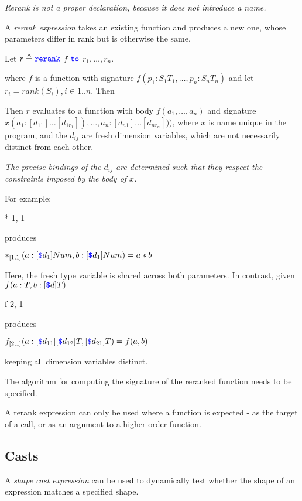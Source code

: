 \documentclass{article}
\begin{document}
{{\em
Rerank is not a proper declaration, because it does not introduce a name. 
}

A {\em rerank expression} takes an existing function and produces a new one, whose parameters differ in rank but is otherwise the same.

\RerankExpression

Let $r \triangleq  \texttt{\color{blue} rerank}{}$ $f$  $\texttt{\color{blue} to}{}$ $r_1, \ldots, r_n$.

where $f$ is a function with signature $f(p_1: S_1 T_1, \ldots, p_n: S_n T_n)$ and let $r_i = rank(S_i), i \in 1..n$. Then

Then $r$ evaluates to a function with body $f(a_1, \ldots, a_n)$ and signature 
$x(a_1: [d_{11}]\ldots [d_{1{r_1}}]), \ldots, a_n: [d_{n1}]\ldots [d_{n{r_n}}]))$, where $x$ is name unique in the program, and the $d_{ij}$ are fresh dimension variables, which are not necessarily distinct from each other.

{\em
The precise bindings of the $d_{ij}$ are determined such that they respect the constraints imposed by the body of $x$.

For example:

\RERANK{} * \TO{} 1, 1

produces

$*_{[1,1]}(a: [\texttt{\color{blue} \$}{}d_1] Num, b: [\texttt{\color{blue} \$}{}d_1] Num) = a * b$

Here, the fresh type variable is shared across both parameters. In contrast, given  $f(a: T, b: [\texttt{\color{blue} \$}{}d] T)$

\RERANK{} f \TO{} 2, 1

 produces

$f_{[2,1]}(a: [\texttt{\color{blue} \$}{}d_{11}][\texttt{\color{blue} \$}{}d_{12}] T, [\texttt{\color{blue} \$}{}d_{21}] T) = f(a, b)$

keeping all dimension variables distinct.

The algorithm for computing the signature of the reranked function needs to be specified.
}

A rerank expression can only be used where a function is expected - as the target of a call, or as an argument to a higher-order function.

\subsection{Casts}
\label{casts}

A {\em shape cast expression} can be used to dynamically test whether the shape of an expression matches a specified shape.

}
\end{document}

